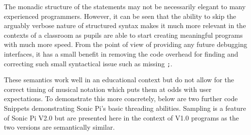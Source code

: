 \documentclass[11pt]{scrartcl}
\begin{document}
The monadic structure of the statements may not be necessarily elegant to many 
experienced programmers. However, it can be seen that the ability to skip the 
arguably verbose nature of structured syntax makes it much more relevant in 
the contexts of a classroom as pupils are able to start creating meaningful 
programs with much more speed. From the point of view of providing any future 
debugging interfaces, it has a small benefit in removing the code overhead for 
finding and correcting such small syntactical issue such as missing \texttt{;}. 

These semantics work well in an educational context but do not allow for the 
correct timing of musical notation which puts them at odds with user 
expectations. To demonstrate this more concretely, below are two further code 
Snippets demonstrating Sonic Pi's basic threading abilities. Sampling is a 
feature of Sonic Pi V2.0 but are presented here in the context of V1.0 
programs as the two versions are semantically similar.
\end{document}
